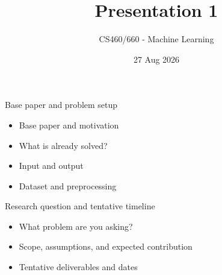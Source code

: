 \documentclass[aspectratio=169]{beamer}
\title{Presentation 1}
\author{CS460/660 - Machine Learning}
\date{27 Aug 2026}
\begin{document}
\begin{frame}{Base paper and problem setup}
\begin{itemize}
  \item Base paper and motivation
  \item What is already solved?
  \item Input and output
  \item Dataset and preprocessing
\end{itemize}
\end{frame}
\begin{frame}{Research question and tentative timeline}
\begin{itemize}
  \item What problem are you asking?
  \item Scope, assumptions, and expected contribution
  \item Tentative deliverables and dates
\end{itemize}
\end{frame}
\end{document}
